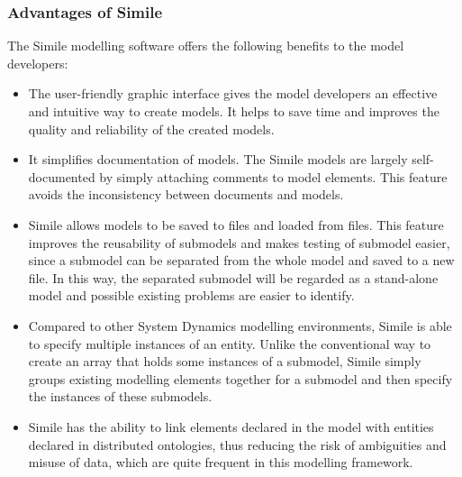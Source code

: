 \subsubsection{Advantages of Simile}
\par
The Simile modelling software offers the following benefits to the model developers:

\begin{itemize}
\item 
The user-friendly graphic interface gives the model developers an effective and intuitive way to create models. It helps to save time and improves the quality and reliability of the created models.
\item
It simplifies documentation of models. The Simile models are largely self-documented by simply attaching comments to model elements. \autocite{dsl:simile-muetzelfeldt} This feature avoids the inconsistency between documents and models. 
\item
Simile allows models to be saved to files and loaded from files. This feature improves the reusability of submodels and makes testing of submodel easier, since a submodel can be separated from the whole model and saved to a new file. In this way, the separated submodel will be regarded as a stand-alone model and possible existing problems are easier to identify.
\item
Compared to other System Dynamics modelling environments, Simile is able to specify multiple instances of an entity. \autocite{dsl:simile-muetzelfeldt} Unlike the conventional way to create an array that holds some instances of a submodel, Simile simply groups existing modelling elements together for a submodel and then specify the instances of these submodels.
\item 
Simile has the ability to link elements declared in the model with entities declared in distributed ontologies, thus reducing the risk of ambiguities and misuse of data, which are quite frequent in this modelling framework.
\end{itemize}

